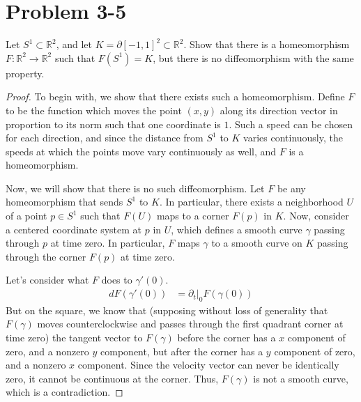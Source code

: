 \documentclass[fontsize=11pt]{scrartcl} %
\numberwithin{equation}{section} %
\numberwithin{figure}{section} %
\numberwithin{table}{section} %
\newcommand{\R}{\mathbb{R}}
\begin{document}
\section*{Problem 3-5}
Let $S^1\subset\R^2$, and let $K=\partial [-1,1]^2\subset\R^2$. Show that there
is a homeomorphism $F:\R^2\to\R^2$ such that $F(S^1) = K$, but there is no diffeomorphism
with the same property.
\\
\begin{proof}
To begin with, we show that there exists such a homeomorphism. Define $F$ to be
the function which moves the point $(x,y)$ along its direction vector in proportion
to its norm such that one coordinate is $1$. Such a speed can be chosen for each
direction, and since the distance from $S^1$ to $K$ varies continuously, the speeds
at which the points move vary continuously as well, and $F$ is a homeomorphism.

Now, we will show that there is no such diffeomorphism. Let $F$ be any homeomorphism that
sends $S^1$ to $K$. In particular, there exists a neighborhood $U$ of a point $p\in S^1$ 
such that $F(U)$ maps to a corner $F(p)$ in $K$. Now, consider a centered coordinate system
at $p$ in $U$, which defines a smooth curve $\gamma$ passing through $p$ at time zero.
In particular, $F$ maps $\gamma$ to a smooth curve on $K$ passing through the corner $F(p)$
at time zero.

Let's consider what $F$ does to $\gamma'(0)$.
\[
\begin{aligned}
dF(\gamma'(0)) &= \partial_t|_0 F(\gamma(0))
\end{aligned}
\]
But on the square, we know that (supposing without loss of generality that $F(\gamma)$ moves
counterclockwise and passes through the first quadrant corner at time zero) the tangent
vector to $F(\gamma)$ before the corner has a $x$ component of zero, and a nonzero $y$ component,
but after the corner has a $y$ component of zero, and a nonzero $x$ component. Since
the velocity vector can never be identically zero, it cannot be continuous at the corner.
Thus, $F(\gamma)$ is not a smooth curve, which is a contradiction.
\end{proof}
\pagebreak
\end{document}
